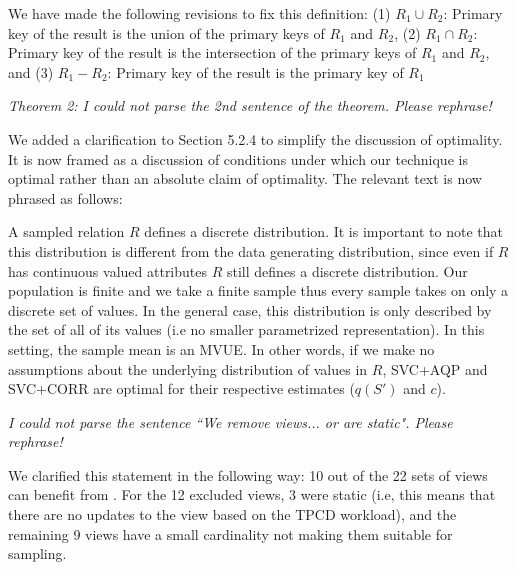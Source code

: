 We have made the following revisions to fix this definition:
(1) $R_1 \cup R_2$: Primary key of the result is the union of the primary keys of $R_1$ and $R_2$, (2) $R_1 \cap R_2$: Primary key of the result is the intersection of the primary keys of $R_1$ and $R_2$, and (3) $R_1 - R_2$: Primary key of the result is the primary key of $R_1$


\vspace{1em}
\emph{Theorem 2: I could not parse the 2nd sentence of the theorem. Please rephrase!}

We added a clarification to Section 5.2.4 to simplify the discussion of optimality. It is now framed as a discussion of conditions under which our technique is optimal rather than an absolute claim of optimality. The relevant text is now phrased as follows:
\begin{displayquote}
A sampled relation $R$ defines a discrete distribution. It is important to note that this distribution is different from the data generating distribution, since even if $R$ has continuous valued attributes $R$ still defines a discrete distribution. Our population is finite and we take a finite sample thus every sample takes on only a discrete set of values. In the general case, this distribution is only described by the set of all of its values (i.e no smaller parametrized representation). In this setting, the sample mean is an MVUE. In other words, if we make no assumptions about the underlying distribution of values in $R$, SVC+AQP and SVC+CORR are optimal for their respective estimates ($q(S')$ and $c$).
\end{displayquote}


\vspace{1em}
\emph{I could not parse the sentence ``We remove views... or are static". Please rephrase!}

We clarified this statement in the following way:
10 out of the 22 sets of views can benefit from \svc.
For the 12 excluded views, 3 were static (i.e, this means that there are no updates to the view based on the TPCD workload), and the remaining 9 views have a small cardinality not making them suitable for sampling.


